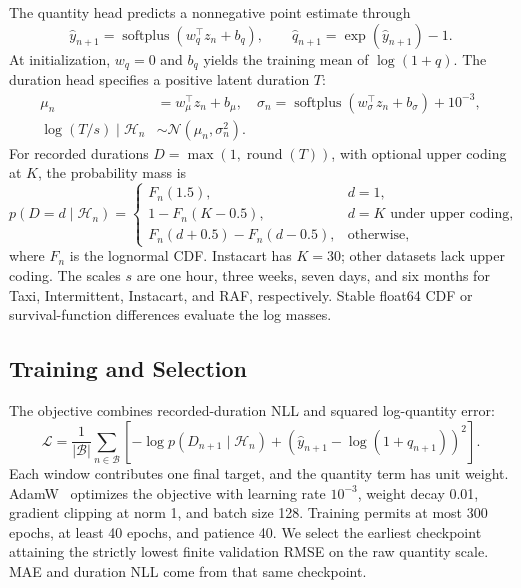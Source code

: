 \documentclass[runningheads]{llncs}
\newcommand{\softplus}{\operatorname{softplus}}
\newcommand{\Hcal}{\mathcal{H}}
\begin{document}
The quantity head predicts a nonnegative point estimate through
\begin{equation}
 \widehat y_{n+1}=\softplus(w_q^\top z_n+b_q),\qquad
 \widehat q_{n+1}=\exp(\widehat y_{n+1})-1.\label{eq:quantity}
\end{equation}
At initialization, $w_q=0$ and $b_q$ yields the training mean of
$\log(1+q)$. The duration head specifies a positive latent duration $T$:
\begin{equation}
 \begin{aligned}
 \mu_n&=w_\mu^\top z_n+b_\mu,\quad
 \sigma_n=\softplus(w_\sigma^\top z_n+b_\sigma)+10^{-3},\\
 \log(T/s)\mid\Hcal_n&\sim\mathcal N(\mu_n,\sigma_n^2).
 \end{aligned}
 \label{eq:duration}
\end{equation}
For recorded durations $D=\max(1,\operatorname{round}(T))$, with optional
upper coding at $K$, the probability mass is
\begin{equation}
 p(D=d\mid\Hcal_n)=
 \begin{cases}
 F_n(1.5),&d=1,\\
 1-F_n(K-0.5),&d=K\text{ under upper coding},\\
 F_n(d+0.5)-F_n(d-0.5),&\text{otherwise},
 \end{cases}\label{eq:mass}
\end{equation}
where $F_n$ is the lognormal CDF. Instacart has $K=30$; other datasets lack
upper coding. The scales $s$ are one hour, three weeks, seven days, and six
months for Taxi, Intermittent, Instacart, and RAF, respectively. Stable
float64 CDF or survival-function differences evaluate the log masses.

\subsection{Training and Selection}
The objective combines recorded-duration NLL and squared log-quantity error:
\begin{equation}
 \mathcal L=\frac1{|\mathcal B|}\sum_{n\in\mathcal B}
 \left[-\log p(D_{n+1}\mid\Hcal_n)
 +(\widehat y_{n+1}-\log(1+q_{n+1}))^2\right].\label{eq:loss}
\end{equation}
Each window contributes one final target, and the quantity term has unit
weight. AdamW~\cite{loshchilov2019adamw} optimizes the objective with learning
rate $10^{-3}$, weight decay 0.01, gradient clipping at norm 1, and batch size
128. Training permits at most 300 epochs, at least 40 epochs, and patience
40. We select the earliest checkpoint attaining the strictly lowest finite
validation RMSE on the raw quantity scale. MAE and duration NLL come from
that same checkpoint.
\end{document}

